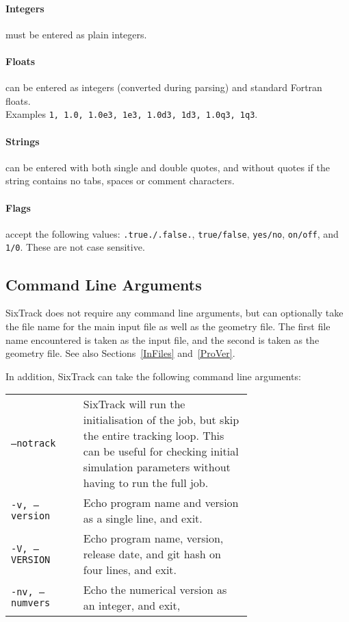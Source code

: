 \paragraph{Integers} must be entered as plain integers.
\paragraph{Floats} can be entered as integers (converted during parsing) and standard Fortran floats.\\
Examples \texttt{1, 1.0, 1.0e3, 1e3, 1.0d3, 1d3, 1.0q3, 1q3}.
\paragraph{Strings} can be entered with both single and double quotes, and without quotes if the string contains no tabs, spaces or comment characters.
\paragraph{Flags} accept the following values: \texttt{.true./.false.}, \texttt{true/false}, \texttt{yes/no}, \texttt{on/off}, and \texttt{1/0}. These are not case sensitive.

\subsection{Command Line Arguments} \label{sec:cmdarg}

SixTrack does not require any command line arguments, but can optionally take the file name for the main input file as well as the geometry file.
The first file name encountered is taken as the input file, and the second is taken as the geometry file.
See also Sections~\ref{InFiles} and~\ref{ProVer}.

\bigskip
\noindent In addition, SixTrack can take the following command line arguments:\\

\begin{tabular}{@{}lp{0.7\linewidth}}
    \texttt{--notrack} & SixTrack will run the initialisation of the job, but skip the entire tracking loop. This can be useful for checking initial simulation parameters without having to run the full job.\index{notrack} \\
    \texttt{-v, --version} & Echo program name and version as a single line, and exit. \\
    \texttt{-V, --VERSION} & Echo program name, version, release date, and git hash on four lines, and exit. \\
    \texttt{-nv, --numvers} & Echo the numerical version as an integer, and exit,
\end{tabular}
